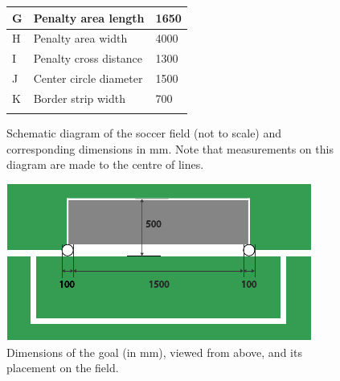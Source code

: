 \begin{figure}[b!]
\begin{tabular}{|l|l|l|}
		\hline \hline
		G & Penalty area length & 1650 \\
		\hline
		H & Penalty area width & 4000 \\
		\hline
		I & Penalty cross distance & 1300 \\
		\hline
		J & Center circle diameter & 1500 \\
		\hline
		K & Border strip width & 700 \\
		\hline
		&  &  \\
	\end{tabular}
	\caption{Schematic diagram of the   soccer field (not to scale) and corresponding dimensions in mm. Note that measurements on this diagram are made to the centre of lines.} \label{fig:field_dim}
\end{figure}


\begin{figure}[t!]
	\begin{center}
		\leavevmode
		\includegraphics[width=1\columnwidth]{figs/goalDimensions2015.pdf}
		\caption{Dimensions of the goal (in mm), viewed from above, and its placement on the field.}
		\label{fig:goal_dimensions}
	\end{center}
\end{figure}

